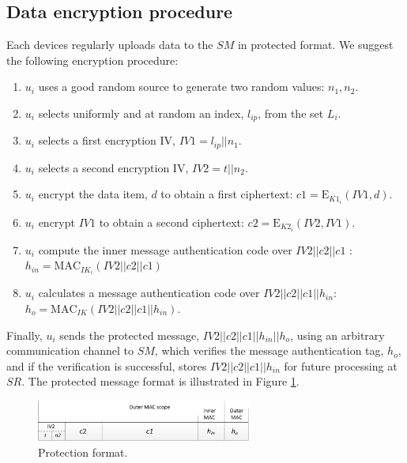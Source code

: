 {\subsection{Data encryption procedure}
\label{dataprotection:encryption}
Each devices regularly uploads data to the $SM$ in protected format. We suggest the following encryption procedure:
\begin{enumerate}
    \item $u_i$ uses a good random source to generate two random values: $n_1,n_2$.
    \item $u_i$ selects uniformly and at random an index, $l_{ip}$, from the set $L_i$.
    \item $u_i$ selects a first encryption IV, $IV1 = l_{ip}||n_1$.
    \item $u_i$ selects a second encryption IV, $IV2 = t||n_2$.
    \item $u_i$ encrypt the data item, $d$ to obtain a first ciphertext: $c1 = \text{E}_{K1_i}(IV1,d)$.
    \item $u_i$ encrypt $IV1$ to obtain a second ciphertext: $c2= \text{E}_{K2_i}(IV2,IV1)$.
    \item $u_i$ compute the inner message authentication code over $IV2||c2||c1$ : \\ $h_{in} = \text{MAC}_{IK_i}(IV2||c2||c1)$           
    \item $u_i$ calculates a message authentication code over $IV2||c2||c1||h_{in}$: $h_o = \text{MAC}_{IK}(IV2||c2||c1||h_{in})$.
\end{enumerate}
Finally, $u_i$ sends the protected message, $IV2||c2||c1||h_{in}||h_o$, using an arbitrary communication channel to $SM$, which verifies the message authentication tag, $h_o$, and if the verification is successful, stores $IV2||c2||c1||h_{in}$ for future processing at $SR$. The protected message format is illustrated in Figure \ref{fig:protection}.
\begin{figure}[ht]
    \centering
    \includegraphics[width=200pt]{papers/ppiot/images/ProtectionFormat}
    \caption{Protection format.}
    \label{fig:protection}
\end{figure}
}

